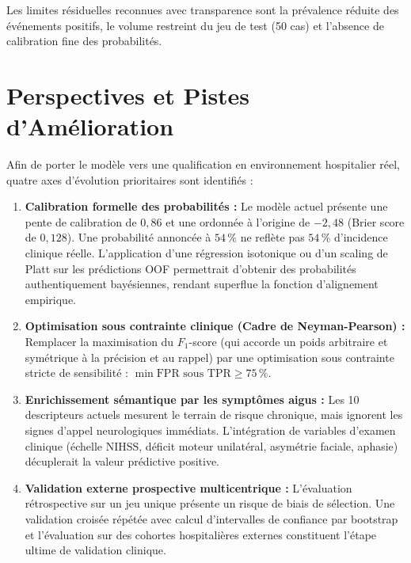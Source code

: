 \documentclass[11pt,a4paper]{article}
\begin{document}
Les limites résiduelles reconnues avec transparence sont la prévalence réduite des événements positifs, le volume restreint du jeu de test (50 cas) et l'absence de calibration fine des probabilités.

\section{Perspectives et Pistes d'Amélioration}

Afin de porter le modèle vers une qualification en environnement hospitalier réel, quatre axes d'évolution prioritaires sont identifiés :

\begin{enumerate}[label=\textbf{\arabic*.}]
    \item \textbf{Calibration formelle des probabilités :}
    Le modèle actuel présente une pente de calibration de $0{,}86$ et une ordonnée à l'origine de $-2{,}48$ (Brier score de $0{,}128$). Une probabilité annoncée à $54\,\%$ ne reflète pas $54\,\%$ d'incidence clinique réelle. L'application d'une régression isotonique ou d'un scaling de Platt sur les prédictions OOF permettrait d'obtenir des probabilités authentiquement bayésiennes, rendant superflue la fonction d'alignement empirique.
    
    \item \textbf{Optimisation sous contrainte clinique (Cadre de Neyman-Pearson) :}
    Remplacer la maximisation du $F_1$-score (qui accorde un poids arbitraire et symétrique à la précision et au rappel) par une optimisation sous contrainte stricte de sensibilité : $\min \text{FPR} \text{ sous } \text{TPR} \ge 75\,\%$.
    
    \item \textbf{Enrichissement sémantique par les symptômes aigus :}
    Les 10 descripteurs actuels mesurent le terrain de risque chronique, mais ignorent les signes d'appel neurologiques immédiats. L'intégration de variables d'examen clinique (échelle NIHSS, déficit moteur unilatéral, asymétrie faciale, aphasie) décuplerait la valeur prédictive positive.
    
    \item \textbf{Validation externe prospective multicentrique :}
    L'évaluation rétrospective sur un jeu unique présente un risque de biais de sélection. Une validation croisée répétée avec calcul d'intervalles de confiance par bootstrap et l'évaluation sur des cohortes hospitalières externes constituent l'étape ultime de validation clinique.
\end{enumerate}
\end{document}
